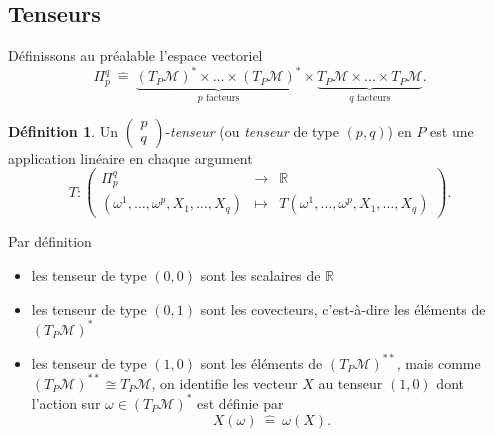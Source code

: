 \documentclass[a4paper,11pt]{report}
\theoremstyle{definition}
\theoremstyle{plain}
\theoremstyle{definition}
\newtheorem{defn}{Définition}[chapter]
\theoremstyle{remark}
\newcommand{\M}{\mathscr{M}}
\newcommand{\tens}[2]{\begin{pmatrix}#1\\#2\end{pmatrix}}
\begin{document}
            \subsection{Tenseurs}
                
                Définissons au préalable l'espace vectoriel
                \begin{equation}
                    \Pi^q_p ~\hat{=}~ \underbrace{(T_P\M)^*\times\dots\times (T_P\M)^*}_{\text{$p$ facteurs}}\times\underbrace{T_P\M\times\dots\times T_P\M}_{\text{$q$ facteurs}}.
                \end{equation}
                
                \begin{defn}
                    Un $\tens{p}{q}$-\textit{tenseur} (ou \textit{tenseur} de type $(p,q)$) en $P$ est une application linéaire en chaque argument
                    \begin{equation}
                        T:\left(
                    \begin{array}{ccc}
                        \Pi^q_p & \longrightarrow & \mathbb{R} \\
                        (\omega^1,\dots,\omega^p,X_1,\dots,X_q) & \longmapsto & T(\omega^1,\dots,\omega^p,X_1,\dots,X_q)
                    \end{array}
                    \right).
                    \end{equation}
                \end{defn}
                
                Par définition
                \begin{itemize}[label = \textbullet]
                    \item les tenseur de type $(0,0)$ sont les scalaires de $\mathbb{R}$
                    \item les tenseur de type $(0,1)$ sont les covecteurs, c'est-à-dire les éléments de $(T_P\M)^*$
                    \item les tenseur de type $(1,0)$ sont les éléments de $(T_P\M)^{**}$, mais comme $(T_P\M)^{**}\cong T_P\M$, on identifie les vecteur $X$ au tenseur $(1,0)$ dont l'action sur $\omega\in(T_P\M)^*$ est définie par
                    \begin{equation}
                        X(\omega)~\hat{=}~\omega(X).
                    \end{equation}
                \end{itemize}
                
\end{document}

